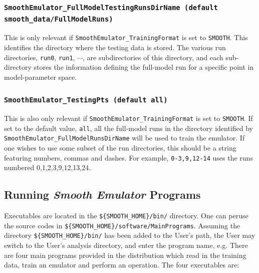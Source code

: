 \documentclass[UserManual.tex]{subfiles}
\begin{document}
\begin{sloppypar}
\subsubsection{{\tt SmoothEmulator\_FullModelTestingRunsDirName (default smooth\_data/FullModelRuns)}}
This is only relevant if {\tt SmoothEmulator\_TrainingFormat} is set to {\tt SMOOTH}. This identifies the directory where the testing data is stored. The various run directories, {\tt run0}, {\tt run1}, $\cdots$, are subdirectories of this directory, and each sub-directory stores the information defining the full-model run for a specific point in model-parameter space.

\subsubsection{{\tt SmoothEmulator\_TestingPts (default all)}}
This is also only relevant if {\tt SmoothEmulator\_TrainingFormat} is set to {\tt SMOOTH}. If set to the default value, {\tt all}, all the full-model runs in the directory identified by {\tt SmoothEmulator\_FullModelRunsDirName} will be used to train the emulator. If one wishes to use some subset of the run directories, this should be a string featuring numbers, commas and dashes. For example, {\tt 0-3,9,12-14} uses the runs numbered 0,1,2,3,9,12,13,24.

\subsection{Running {\it Smooth Emulator} Programs}

Executables are located in the {\tt \$\{SMOOTH\_HOME\}/bin/} directory. One can peruse the source codes in {\tt \$\{SMOOTH\_HOME\}/software/MainPrograms}. Assuming the directory {\tt \$\{SMOOTH\_HOME\}/bin/} has been added to the User's path, the User may switch to the User's analysis directory, and enter the program name, e.g.
\vspace*{-8pt}
There are four main programs provided in the distribution which read in the training data, train an emulator and perform an operation. The four executables are:

\end{sloppypar}
\end{document}
